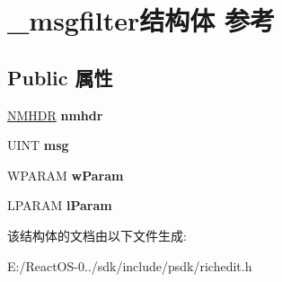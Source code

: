 \hypertarget{struct__msgfilter}{}\section{\+\_\+msgfilter结构体 参考}
\label{struct__msgfilter}
\subsection*{Public 属性}
\begin{DoxyCompactItemize}
\item 
\mbox{\label{struct__msgfilter_a39b4082a7f1f2b6d6698dfc64553db77}} 
\hyperlink{structtag_n_m_h_d_r}{N\+M\+H\+DR} {\bfseries nmhdr}
\item 
\mbox{\label{struct__msgfilter_a766af87abd22bc491a084af9129d46d9}} 
U\+I\+NT {\bfseries msg}
\item 
\mbox{\label{struct__msgfilter_ab70b4be77711a172d77225a7620acf4b}} 
W\+P\+A\+R\+AM {\bfseries w\+Param}
\item 
\mbox{\label{struct__msgfilter_a1ae5312ae122f12cc5621dd5d5ace500}} 
L\+P\+A\+R\+AM {\bfseries l\+Param}
\end{DoxyCompactItemize}


该结构体的文档由以下文件生成\+:\begin{DoxyCompactItemize}
\item 
E\+:/\+React\+O\+S-\/0../sdk/include/psdk/richedit.\+h\end{DoxyCompactItemize}
